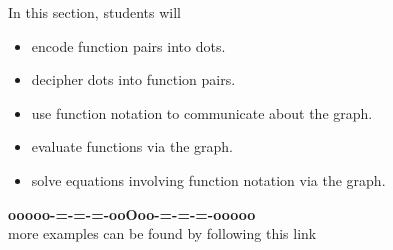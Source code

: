 \documentclass{ximera}
\begin{document}
\begin{sectionOutcomes}
In this section, students will 

\begin{itemize}
\item encode function pairs into dots.
\item decipher dots into function pairs.
\item use function notation to communicate about the graph.
\item evaluate functions via the graph.
\item solve equations involving function notation via the graph.
\end{itemize}
\end{sectionOutcomes}











\begin{center}
\textbf{\textcolor{green!50!black}{ooooo-=-=-=-ooOoo-=-=-=-ooooo}} \\

more examples can be found by following this link\\ 

\end{center}
\end{document}
